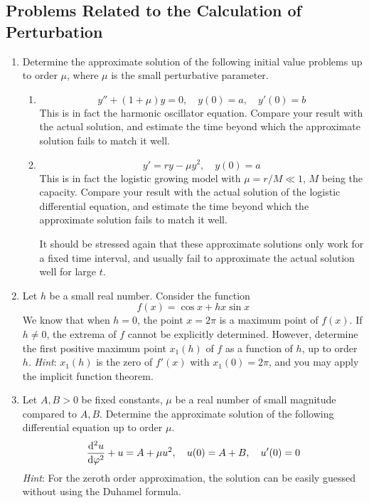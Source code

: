 \documentclass[../psets.tex]{subfiles}
\begin{document}
\subsection*{Problems Related to the Calculation of Perturbation}
\begin{enumerate}
    \item Determine the approximate solution of the following initial value problems up to order $\mu$, where $\mu$ is the small perturbative parameter.
    \begin{enumerate}
        \item 
        \begin{equation*}
            y''+(1+\mu)y = 0
            ,\quad
            y(0) = a
            ,\quad
            y'(0) = b
        \end{equation*}
        This is in fact the harmonic oscillator equation. Compare your result with the actual solution, and estimate the time beyond which the approximate solution fails to match it well.
        \item 
        \begin{equation*}
            y' = ry-\mu y^2
            ,\quad
            y(0) = a
        \end{equation*}
        This is in fact the logistic growing model with $\mu=r/M\ll 1$, $M$ being the capacity. Compare your result with the actual solution of the logistic differential equation, and estimate the time beyond which the approximate solution fails to match it well.\par
        It should be stressed again that these approximate solutions only work for a fixed time interval, and usually fail to approximate the actual solution well for large $t$.
    \end{enumerate}
    \item Let $h$ be a small real number. Consider the function
    \begin{equation*}
        f(x) = \cos x+hx\sin x
    \end{equation*}
    We know that when $h=0$, the point $x=2\pi$ is a maximum point of $f(x)$. If $h\neq 0$, the extrema of $f$ cannot be explicitly determined. However, determine the first positive maximum point $x_1(h)$ of $f$ as a function of $h$, up to order $h$. \emph{Hint}: $x_1(h)$ is the zero of $f'(x)$ with $x_1(0)=2\pi$, and you may apply the implicit function theorem.
    \item Let $A,B>0$ be fixed constants, $\mu$ be a real number of small magnitude compared to $A,B$. Determine the approximate solution of the following differential equation up to order $\mu$.
    \begin{equation*}
        \dv[2]{u}{\varphi}+u = A+\mu u^2
        ,\quad
        u(0) = A+B
        ,\quad
        u'(0) = 0
    \end{equation*}
    \emph{Hint}: For the zeroth order approximation, the solution can be easily guessed without using the Duhamel formula.
\end{enumerate}
\end{document}
